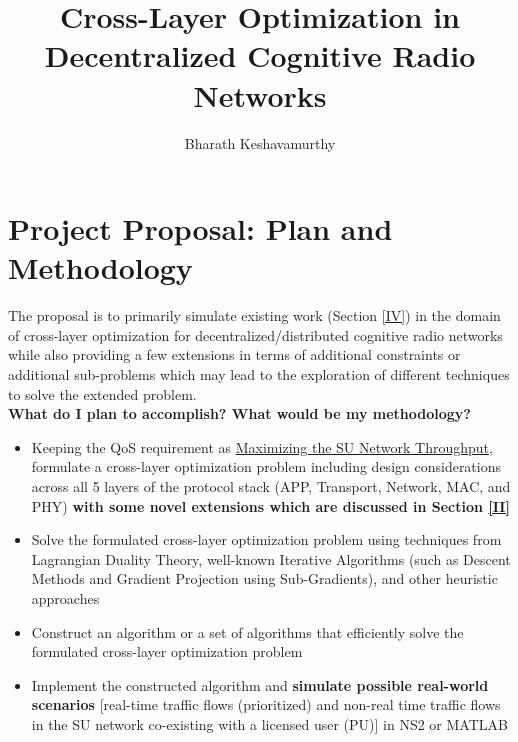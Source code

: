 \documentclass[12pt, draftcls, onecolumn]{IEEEtran}
\begin{document}
\title{Cross-Layer Optimization in Decentralized Cognitive Radio Networks}
\author{Bharath Keshavamurthy}
\maketitle
\section{Project Proposal: Plan and Methodology}
The proposal is to primarily simulate existing work (Section \ref{IV}) in the domain of cross-layer optimization for decentralized/distributed cognitive radio networks while also providing a few extensions in terms of additional constraints or additional sub-problems which may lead to the exploration of different techniques to solve the extended problem.
\\\textbf{What do I plan to accomplish? What would be my methodology?}
\begin{itemize}
    \item Keeping the QoS requirement as \underline{Maximizing the SU Network Throughput}, formulate a cross-layer optimization problem including design considerations across all 5 layers of the protocol stack (APP, Transport, Network, MAC, and PHY) \textbf{with some novel extensions which are discussed in Section \ref{II}}
    \item Solve the formulated cross-layer optimization problem using techniques from Lagrangian Duality Theory, well-known Iterative Algorithms (such as Descent Methods and Gradient Projection using Sub-Gradients), and other heuristic approaches
    \item Construct an algorithm or a set of algorithms that efficiently solve the formulated cross-layer optimization problem
    \item Implement the constructed algorithm and \textbf{simulate possible real-world scenarios} [real-time traffic flows (prioritized) and non-real time traffic flows in the SU network co-existing with a licensed user (PU)] in NS2 or MATLAB
\end{itemize}
\end{document}
